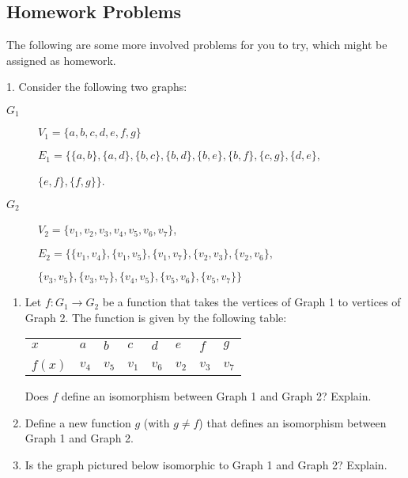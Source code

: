 \documentclass[10pt,]{book}
\theoremstyle{plain}
\theoremstyle{definition}
\theoremstyle{definition}
\theoremstyle{definition}
\numberwithin{equation}{chapter}
\newcommand{\hrulethin}  {\noalign{\hrule height 0.04em}}
\newcommand{\vtx}[2]{node[fill,circle,inner sep=0pt, minimum size=4pt,label=#1:#2]{}}
\renewcommand{\v}{\vtx{above}{}}
\begin{document}
\subsection[Homework Problems]{Homework Problems}\label{exercises-30}

      The following are some more involved problems for you to try, which might be assigned as homework.
\begin{exerciselist}
\item[1.]\hypertarget{exercise-313}{}
            Consider the following two graphs:
\leavevmode%
\begin{description}
\item[\(G_1\)]\hypertarget{li-1295}{}\(V_1=\{a,b,c,d,e,f,g\}\)%
\par
\(E_1=\{\{a,b\},\{a,d\},\{b,c\},\{b,d\},\{b,e\},\{b,f\},\{c,g\},\{d,e\},\)%
\par
\(\{e,f\},\{f,g\}\}\).%
\item[\(G_2\)]\hypertarget{li-1296}{}\(V_2=\{v_1,v_2,v_3,v_4,v_5,v_6,v_7\}\),%
\par

                \(E_2=\{\{v_1,v_4\},\{v_1,v_5\},\{v_1,v_7\},\{v_2,v_3\},\{v_2,v_6\},\)%
\par

                \(\{v_3,v_5\},\{v_3,v_7\},\{v_4,v_5\},\{v_5,v_6\},\{v_5,v_7\}\}\)
\end{description}
\leavevmode%
\begin{enumerate}[label=(\alph*)]
\item\hypertarget{li-1297}{}
                Let \(f:G_1 \rightarrow G_2\) be a function that takes the vertices of Graph 1 to vertices of Graph 2. The function is given by the following table:
                \begin{tabular}{llllllll}
\(x\)&\(a\)&\(b\)&\(c\)&\(d\)&\(e\)&\(f\)&\(g\)\tabularnewline[0pt]
&\tabularnewline\hrulethin
\(f(x)\)&\(v_4\)&\(v_5\)&\(v_1\)&\(v_6\)&\(v_2\)&\(v_3\)&\(v_7\)
\end{tabular}

                Does \(f\) define an isomorphism between Graph 1 and Graph 2? Explain.


\item\hypertarget{li-1298}{}
                Define a new function \(g\) (with \(g\not=f\)) that defines an isomorphism between Graph 1 and Graph 2.


\item\hypertarget{li-1299}{}
                Is the graph pictured below isomorphic to Graph 1 and Graph 2? Explain.
                \leavevmode%
\begin{figure}
\centering
{
}
\end{figure}



\end{enumerate}
\end{exerciselist}
\end{document}
